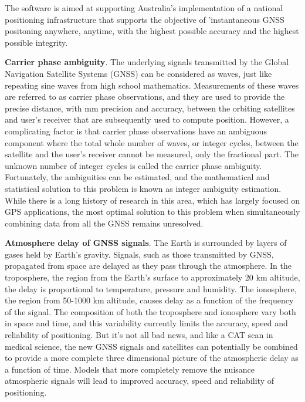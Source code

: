 The software is aimed at supporting Australia's implementation of a national positioning infrastructure that supports the objective of 'instantaneous GNSS positoning anywhere, anytime, with the highest possible accuracy and the highest possible integrity.

\textbf{Carrier phase ambiguity}. The underlying signals transmitted by the Global Navigation Satellite Systems (GNSS) can be considered as waves, just like repeating sine waves from high school mathematics. Measurements of these waves are referred to as carrier phase observations, and they are used to provide the precise distance, with mm precision and accuracy, between the orbiting satellites and user’s receiver that are subsequently used to compute position. However, a complicating factor is that carrier phase observations have an ambiguous component where the total whole number of waves, or integer cycles, between the satellite and the user’s receiver cannot be measured, only the fractional part. The unknown number of integer cycles is called the carrier phase ambiguity. Fortunately, the ambiguities can be estimated, and the mathematical and statistical solution to this problem is known as integer ambiguity estimation. While there is a long history of research in this area, which has largely focused on GPS applications, the most optimal solution to this problem when simultaneously combining data from all the GNSS remains unresolved.

\textbf{Atmosphere delay of GNSS signals}. The Earth is surrounded by layers of gases held by Earth's gravity. Signals, such as those transmitted by GNSS, propagated from space are delayed as they pass through the atmosphere. In the troposphere, the region from the Earth’s surface to approximately 20 km altitude, the delay is proportional to temperature, pressure and humidity. The ionosphere, the region from 50-1000 km altitude, causes delay as a function of the frequency of the signal. The composition of both the troposphere and ionosphere vary both in space and time, and this variability currently limits the accuracy, speed and reliability of positioning. But it’s not all bad news, and like a CAT scan in medical science, the new GNSS signals and satellites can potentially be combined to provide a more complete three dimensional picture of the atmospheric delay as a function of time. Models that more completely remove the nuisance atmospheric signals will lead to improved accuracy, speed and reliability of positioning.

